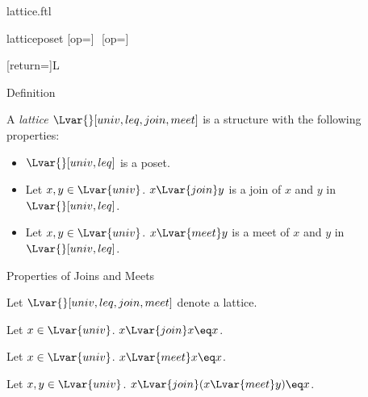 \documentclass{naproche-library}
\begin{document}
\begin{smodule}[title=Lattices]{lattice.ftl}
\begin{extstructure}{lattice}{poset}
  [op=\vee]{\,\vee\,}
  [op=\wedge]{\,\wedge\,}
\end{extstructure}
[return={\lattice[comp=##1]}]{\mathcal L}

\begin{sfragment}{Definition}
  \begin{signature}[forthel,id=LatticeSig]
    A \emph{lattice $\Lvar{}[univ,leq,join,meet]$} is a structure with the following properties:
    
    \begin{itemize}
      \item\label{latticeSig}
        $\Lvar{}[univ,leq]$ is a poset.
      \item\label{latticeJoinSig}
        Let $x,y\in\Lvar{univ}$.
        $x{\Lvar{join}}y$ is a join of $x$ and $y$ in $\Lvar{}[univ,leq]$.
      \item\label{latticeMeetSig}
        Let $x,y\in\Lvar{univ}$.
        $x{\Lvar{meet}}y$ is a meet of $x$ and $y$ in $\Lvar{}[univ,leq]$.
    \end{itemize}
  \end{signature}
\end{sfragment}

\begin{sfragment}{Properties of Joins and Meets}
  \begin{convention}[forthel]
    Let $\Lvar{}[univ,leq,join,meet]$ denote a lattice.
  \end{convention}

  \begin{proposition}[forthel,id=JoinIdempotenceThm]
    Let $x\in\Lvar{univ}$.
    $x{\Lvar{join}}x\eq x$.
  \end{proposition}

  \begin{proposition}[forthel,id=MeetIdempotenceThm]
    Let $x\in\Lvar{univ}$.
    $x{\Lvar{meet}}x\eq x$.
  \end{proposition}

  \begin{proposition}[forthel,id=JoinAbsorbsMeetThm]
    Let $x,y\in\Lvar{univ}$.
    $x{\Lvar{join}}(x{\Lvar{meet}}y)\eq x$.
  \end{proposition}


\end{sfragment}
\end{smodule}
\end{document}
